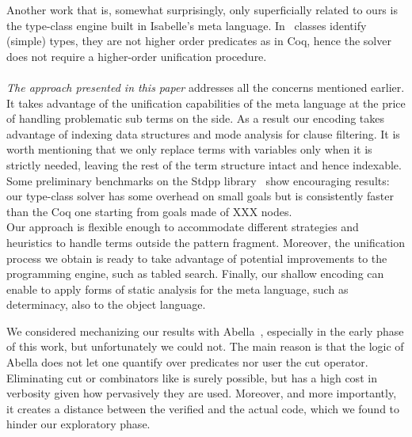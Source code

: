\documentclass[sigconf,natbib=false,review]{acmart}
\begin{document}
Another work that is, somewhat surprisingly, only superficially related to ours is the
type-class engine built in Isabelle's meta language. In~\cite{wenzel97}
classes identify (simple) types, they are not higher order predicates
as in Coq, hence the solver does not require a higher-order unification
procedure.\\
~\\
\emph{The approach presented in this paper}
addresses all the concerns
mentioned earlier. It takes advantage of the
unification capabilities of the meta language
at the price of handling problematic sub terms on
the side.
As a result %
our encoding takes
advantage of indexing data structures and
mode analysis for clause filtering.
It is worth mentioning that we only replace terms with variables only
when it is strictly needed, leaving the rest of the term structure intact
and hence indexable. %
Some preliminary benchmarks on the Stdpp
library~\cite{JUNG_KREBBERS_JOURDAN_BIZJAK_BIRKEDAL_DREYER_2018} show
encouraging results: our type-class solver has some
overhead on small goals but is consistently faster than
the Coq one starting from goals made of XXX nodes.\\
Our approach is flexible enough to accommodate different strategies
and heuristics to handle terms outside the pattern fragment.
Moreover, the unification process we obtain is ready to take
advantage of potential improvements to the programming engine,
such as tabled search. Finally, our shallow encoding can
enable to apply forms of static analysis for
the meta language, such as determinacy, also to the object language.

We considered mechanizing our results with Abella~\cite{gacek2008abella},
especially in the early phase of this work, but unfortunately we could not.
The main reason is that the logic of Abella does not let one quantify over
predicates nor user the cut operator. Eliminating cut or
combinators like  is surely possible, but 
has a high cost in verbosity given how pervasively they are used.
Moreover, and more importantly, it creates a distance
between the verified and the actual code, which we found to
hinder our exploratory phase.





\printbibliography


% 
\end{document}
